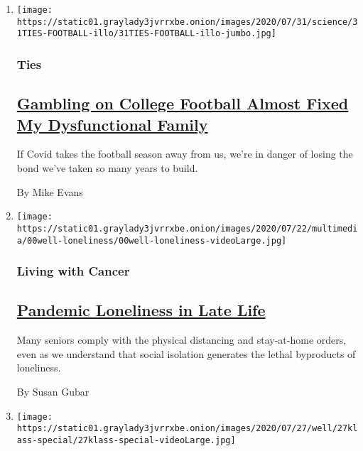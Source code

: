 \begin{enumerate}
\def\labelenumi{\arabic{enumi}.}
\item
  \texttt{[image: https://static01.graylady3jvrrxbe.onion/images/2020/07/31/science/31TIES-FOOTBALL-illo/31TIES-FOOTBALL-illo-jumbo.jpg]}

  \hypertarget{ties}{%
  \subsubsection{Ties}\label{ties}}

  \hypertarget{gambling-on-college-football-almost-fixed-my-dysfunctional-family}{%
  \subsection{\texorpdfstring{\href{/2020/07/31/well/family/gambling-on-college-football-almost-fixed-my-dysfunctional-family.html}{Gambling
  on College Football Almost Fixed My Dysfunctional
  Family}}{Gambling on College Football Almost Fixed My Dysfunctional Family}}\label{gambling-on-college-football-almost-fixed-my-dysfunctional-family}}

  If Covid takes the football season away from us, we're in danger of
  losing the bond we've taken so many years to build.

  By Mike Evans
\item
  \texttt{[image: https://static01.graylady3jvrrxbe.onion/images/2020/07/22/multimedia/00well-loneliness/00well-loneliness-videoLarge.jpg]}

  \hypertarget{living-with-cancer}{%
  \subsubsection{Living with Cancer}\label{living-with-cancer}}

  \hypertarget{pandemic-loneliness-in-late-life}{%
  \subsection{\texorpdfstring{\href{/2020/07/30/well/mind/pandemic-loneliness-in-late-life.html}{Pandemic
  Loneliness in Late
  Life}}{Pandemic Loneliness in Late Life}}\label{pandemic-loneliness-in-late-life}}

  Many seniors comply with the physical distancing and stay-at-home
  orders, even as we understand that social isolation generates the
  lethal byproducts of loneliness.

  By Susan Gubar
\item
  \texttt{[image: https://static01.graylady3jvrrxbe.onion/images/2020/07/27/well/27klass-special/27klass-special-videoLarge.jpg]}


\end{enumerate}
